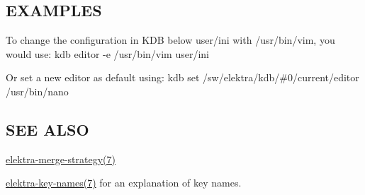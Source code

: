 \subsection*{E\+X\+A\+M\+P\+L\+ES}

To change the configuration in K\+DB below {\ttfamily user/ini} with {\ttfamily /usr/bin/vim}, you would use\+: {\ttfamily kdb editor -\/e /usr/bin/vim user/ini}

Or set a new editor as default using\+: {\ttfamily kdb set /sw/elektra/kdb/\#0/current/editor /usr/bin/nano}

\subsection*{S\+EE A\+L\+SO}


\begin{DoxyItemize}
\item \hyperlink{md_doc_help_elektra-merge-strategy_doc_help_elektra-merge-strategy_md}{elektra-\/merge-\/strategy(7)}
\item \hyperlink{md_doc_help_elektra-key-names_doc_help_elektra-key-names_md}{elektra-\/key-\/names(7)} for an explanation of key names. 
\end{DoxyItemize}